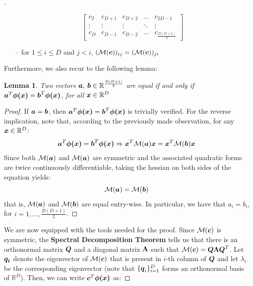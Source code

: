 \documentclass{exam}
\newtheorem{lemma}{Lemma}
\begin{document}
\begin{questions}
\begin{proof}[\unskip\nopunct]
\begin{itemize}
\[\begin{bmatrix}
                    c_2 & c_{D + 1} & c_{D + 2} & \dots & c_{2D - 1} \\
                    \vdots & \vdots & \vdots & \ddots & \vdots \\
                    c_D & c_{D - 1} & c_{D - 2} & \dots & c_{\frac{D(D + 1)}{2}} 
                \end{bmatrix}
            \]
            \item[--] for $1 \le i \le D$ and $j < i$, $(\mathcal{M}(\vb*{c}))_{ij} = (\mathcal{M}(\vb*{c}))_{ji}$
        \end{itemize}
        Furthermore, we also recur to the following lemma:

        \begin{lemma}
            Two vectors $\vb*{a}, \: \vb*{b} \in \mathbb{R}^{\frac{D(D + 1)}{2}}$ are equal if and only if $\vb*{a}^T \vb*{\phi(x)} = \vb*{b}^T \vb*{\phi(x)}$, for all $\vb*{x} \in \mathbb{R}^D$
        \end{lemma}
        \begin{proof}
            If $\vb*{a} = \vb*{b}$, then $\vb*{a}^T \vb*{\phi(x)} = \vb*{b}^T \vb*{\phi(x)}$ is trivially verified. For the reverse implication, note that, according to the previously made observation, for any $\vb*{x} \in \mathbb{R}^D$:
            \[
                \vb*{a}^T \vb*{\phi(x)} = \vb*{b}^T \vb*{\phi(x)} \Rightarrow \vb*{x}^T \mathcal{M}(\vb*{a}) \vb*{x} = \vb*{x}^T \mathcal{M}(\vb*{b}) \vb*{x}
            \]
            Since both $\mathcal{M}(\vb*{a})$ and $\mathcal{M}(\vb*{a})$ are symmetric and the associated quadratic forms are twice continuously differentiable, taking the hessian on both sides of the equation yields:
            \[
                \mathcal{M}(\vb*{a}) = \mathcal{M}(\vb*{b})
            \]
            that is, $\mathcal{M}(\vb*{a})$ and $\mathcal{M}(\vb*{b})$ are equal entry-wise. In particular, we have that $a_i = b_i$, for $i = 1, \dots, \frac{D(D + 1)}{2}$.
        \end{proof}
        We are now equipped with the tools needed for the proof. Since $\mathcal{M}(\vb*{c})$ is symmetric, the \textbf{Spectral Decomposition Theorem} tells us that there is an orthonormal matrix $\vb*{Q}$ and a diagonal matrix $\vb*{\Lambda}$ such that $\mathcal{M}(\vb*{c}) = \vb*{Q} \vb*{\Lambda}\vb*{Q}^T$. Let $\vb*{q_i}$ denote the eigenvector of $\mathcal{M}(\vb*{c})$ that is present in $i$-th column of $\vb*{Q}$ and let $\lambda_i$ be the corresponding eigenvector (note that $\{\vb*{q}_i\}_{i = 1}^{D}$ forms an orthonormal basis of $\mathbb{R}^{D}$). Then, we can write $\vb*{c}^T \vb*{\phi(x)}$ as:

\end{proof}
\end{questions}
\end{document}

